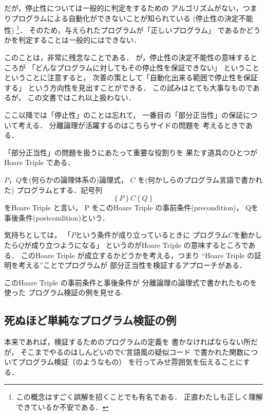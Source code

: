 \documentclass[a4paper, 10pt]{ltjsarticle}
\begin{document}
 だが，停止性については一般的に判定をするための
 アルゴリズムがない，つまりプログラムによる自動化ができないことが知られている
 (停止性の決定不能性)
 \footnote{この概念はすごく誤解を招くことでも有名である．
 正直わたしも正しく理解できているか不安である．}．
 そのため，与えられたプログラムが「正しいプログラム」
 であるかどうかを判定することは一般的にはできない．

 このことは，非常に残念なことである．
 が，停止性の決定不能性の意味するところが
 「どんなプログラムに対してもその停止性を保証できない」
 ということ
 ということに注意すると，
 次善の策として「自動化出来る範囲で停止性を保証する」
 という方向性を見出すことができる．
 この試みはとても大事なものであるが，
 この文書ではこれ以上扱わない．
 
 ここ以降では「停止性」のことは忘れて，
 一番目の「部分正当性」の保証について考える．
 分離論理が活躍するのはこちらサイドの問題を
 考えるときである．

 「部分正当性」の問題を扱うにあたって重要な役割りを
 果たす道具のひとつがHoare Triple である．

\begin{definition}
 $P，Q$を(何らかの論理体系の)論理式，
 $C$ を(何かしらのプログラム言語で書かれた)
 プログラムとする．記号列
\[ \left\{P\right\} C \left\{Q\right\} \]
 をHoare Triple と言い，
 P をこのHoare Triple の事前条件(precondition)，
 Qを事後条件(postcondition)という．
\end{definition}

気持ちとしては，
「$P$という条件が成り立っているときに
プログラム$C$を動かしたら$Q$が成り立つようになる」
というのがHoare Triple の意味するところである．
このHoare Triple が成立するかどうかを考える，つまり
``Hoare Triple の証明を考える''ことでプログラムが
部分正当性を検証するアプローチがある．

このHoare Triple の事前条件と事後条件が
分離論理の論理式で書かれたものを使った
プログラム検証の例を見せる. 
  
  \subsection{死ぬほど単純なプログラム検証の例}
  本来であれば，検証するためのプログラムの定義を
  書かなければならない所だが，
  そこまでやるのはしんどいのでC言語風の疑似コード
  で書かれた関数についてプログラム検証（のようなもの）
  を行ってみせ雰囲気を伝えることにする．
\end{document}
